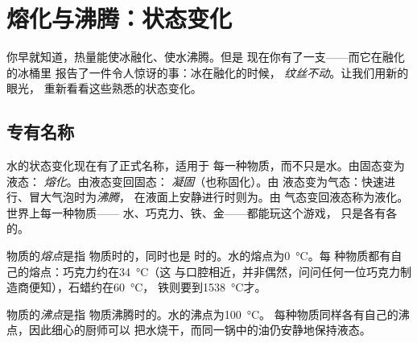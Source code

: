 \chapter{熔化与沸腾：状态变化}\label{ch:g4:changes-of-state}

你早就知道，热量能使冰融化、使水沸腾。但是
现在你有了一支——而它在融化的冰桶里
报告了一件令人惊讶的事：冰在融化的时候，
\emph{纹丝不动}。让我们用新的眼光，
重新看看这些熟悉的状态变化。

\section{专有名称}

水的状态变化现在有了正式名称，适用于
每一种物质，而不只是水。由固态变为液态：
\emph{熔化}。由液态变回固态：
\emph{凝固}（也称固化）。由
液态变为气态：快速进行、冒大气泡时为\emph{沸腾}，
在液面上安静进行时则为。由
气态变回液态称为液化。世界上每一种物质——
水、巧克力、铁、金——都能玩这个游戏，
只是各有各的。

\begin{definition}[熔点]\label{def:g4:changes-of-state:melting-point}
物质的\emph{熔点}是指
物质时的，同时也是
时的。水的熔点为\qty{0}{\celsius}。每
种物质都有自己的熔点：巧克力约在\qty{34}{\celsius}（这
与口腔相近，并非偶然，问问任何一位巧克力制造商便知），石蜡约在\qty{60}{\celsius}，
铁则要到\qty{1538}{\celsius}才。
\end{definition}

\begin{definition}[沸点]\label{def:g4:changes-of-state:boiling-point}
物质的\emph{沸点}是指
物质沸腾时的。水的沸点为\qty{100}{\celsius}。
每种物质同样各有自己的沸点，因此细心的厨师可以
把水烧干，而同一锅中的油仍安静地保持液态。
\end{definition}

